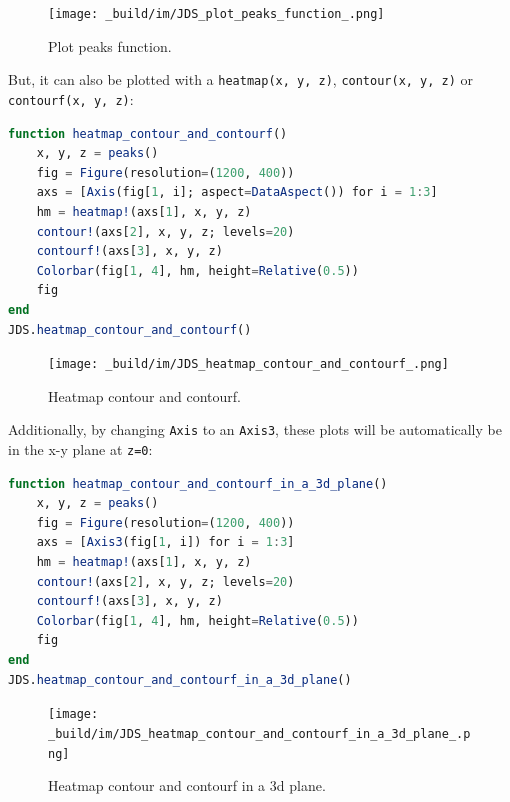 \documentclass[
  notoc %
]{tufte-book}
\newcommand{\passthrough}[1]{#1}
\begin{document}
\begin{figure}
\hypertarget{fig:plot_peaks_function}{%
\centering
\texttt{[image: \_build/im/JDS\_plot\_peaks\_function\_.png]}
\caption{Plot peaks function.}\label{fig:plot_peaks_function}
}
\end{figure}

But, it can also be plotted with a
\passthrough{\lstinline!heatmap(x, y, z)!},
\passthrough{\lstinline!contour(x, y, z)!} or
\passthrough{\lstinline!contourf(x, y, z)!}:

\begin{lstlisting}[language=Julia]
function heatmap_contour_and_contourf()
    x, y, z = peaks()
    fig = Figure(resolution=(1200, 400))
    axs = [Axis(fig[1, i]; aspect=DataAspect()) for i = 1:3]
    hm = heatmap!(axs[1], x, y, z)
    contour!(axs[2], x, y, z; levels=20)
    contourf!(axs[3], x, y, z)
    Colorbar(fig[1, 4], hm, height=Relative(0.5))
    fig
end
JDS.heatmap_contour_and_contourf()
\end{lstlisting}

\begin{figure}
\hypertarget{fig:heatmap_contour_and_contourf}{%
\centering
\texttt{[image: \_build/im/JDS\_heatmap\_contour\_and\_contourf\_.png]}
\caption{Heatmap contour and
contourf.}\label{fig:heatmap_contour_and_contourf}
}
\end{figure}

Additionally, by changing \passthrough{\lstinline!Axis!} to an
\passthrough{\lstinline!Axis3!}, these plots will be automatically be in
the x-y plane at \passthrough{\lstinline!z=0!}:

\begin{lstlisting}[language=Julia]
function heatmap_contour_and_contourf_in_a_3d_plane()
    x, y, z = peaks()
    fig = Figure(resolution=(1200, 400))
    axs = [Axis3(fig[1, i]) for i = 1:3]
    hm = heatmap!(axs[1], x, y, z)
    contour!(axs[2], x, y, z; levels=20)
    contourf!(axs[3], x, y, z)
    Colorbar(fig[1, 4], hm, height=Relative(0.5))
    fig
end
JDS.heatmap_contour_and_contourf_in_a_3d_plane()
\end{lstlisting}

\begin{figure}
\hypertarget{fig:heatmap_contour_and_contourf_in_a_3d_plane}{%
\centering
\texttt{[image: \_build/im/JDS\_heatmap\_contour\_and\_contourf\_in\_a\_3d\_plane\_.png]}
\caption{Heatmap contour and contourf in a 3d
plane.}\label{fig:heatmap_contour_and_contourf_in_a_3d_plane}
}
\end{figure}
\end{document}

